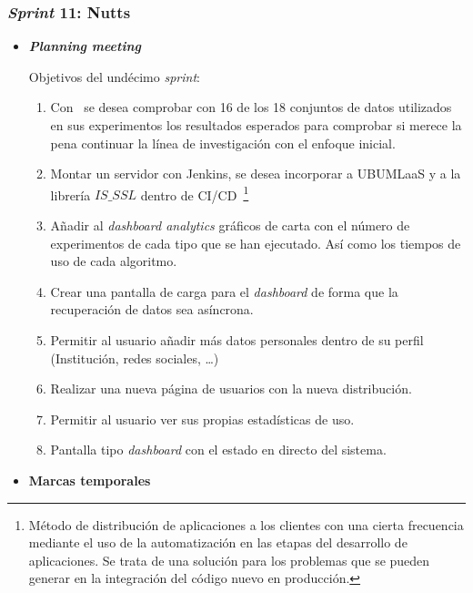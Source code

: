\subsubsection{\textit{Sprint} 11: Nutts}
\begin{itemize}
\item \textbf{\textit{Planning meeting}}

Objetivos del undécimo \textit{sprint}:
\begin{enumerate}
\item Con~\cite{LI2019104895} se desea comprobar con 16 de los 18 conjuntos de datos utilizados en sus experimentos los resultados esperados para comprobar si merece la pena continuar la línea de investigación con el enfoque inicial.

\item Montar un servidor con Jenkins, se desea incorporar a UBUMLaaS y a la librería $IS\_SSL$ dentro de CI/CD~\footnote{Método de distribución de aplicaciones a los clientes con una cierta frecuencia mediante el uso de la automatización en las etapas del desarrollo de aplicaciones. Se trata de una solución para los problemas que se pueden generar en la integración del código nuevo en producción.}
\item Añadir al \textit{dashboard analytics} gráficos de carta con el número de experimentos de cada tipo que se han ejecutado. Así como los tiempos de uso de cada algoritmo.
\item Crear una pantalla de carga para el \textit{dashboard} de forma que la recuperación de datos sea asíncrona.
\item Permitir al usuario añadir más datos personales dentro de su perfil (Institución,  redes sociales, \dots)
\item Realizar una nueva página de usuarios con la nueva distribución.
\item Permitir al usuario ver sus propias estadísticas de uso. 
\item Pantalla tipo \textit{dashboard} con el estado en directo del sistema.
\end{enumerate}
\item \textbf{Marcas temporales}


\end{itemize}
